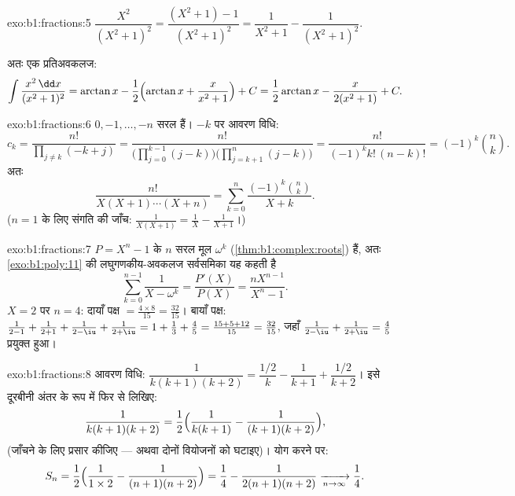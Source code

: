 \begin{solution}{exo:b1:fractions:5}
$\dfrac{X^2}{(X^2+1)^2} = \dfrac{(X^2 + 1) - 1}{(X^2+1)^2} =
\dfrac{1}{X^2+1} - \dfrac{1}{(X^2+1)^2}$.

अतः एक प्रतिअवकलज:
\[
\int \frac{x^2\,\dd x}{(x^2+1)^2}
= \arctan x - \frac12\Bigl(\arctan x + \frac{x}{x^2+1}\Bigr) + C
= \frac12\arctan x - \frac{x}{2(x^2+1)} + C .
\]
\end{solution}

\begin{solution}{exo:b1:fractions:6}
 $0, -1, \dots, -n$ सरल हैं। $-k$ पर आवरण विधि:
\[
c_k = \frac{n!}{\prod_{j \neq k} (-k + j)}
= \frac{n!}{\bigl(\prod_{j=0}^{k-1}(j - k)\bigr)
\bigl(\prod_{j=k+1}^{n}(j-k)\bigr)}
= \frac{n!}{(-1)^k k!\,(n-k)!} = (-1)^k \binom nk .
\]
अतः
\[
\frac{n!}{X(X+1)\cdots(X+n)}
= \sum_{k=0}^{n} \frac{(-1)^k \binom nk}{X + k} .
\]
($n = 1$ के लिए संगति की जाँच: $\frac{1}{X(X+1)} = \frac1X -
\frac{1}{X+1}$।)
\end{solution}

\begin{solution}{exo:b1:fractions:7}
$P = X^n - 1$ के $n$ सरल मूल $\omega^k$ (\cref{thm:b1:complex:roots}) हैं,
अतः \cref{exo:b1:poly:11} की लघुगणकीय-अवकलज सर्वसमिका यह कहती है
\[
\sum_{k=0}^{n-1} \frac{1}{X - \omega^k}
= \frac{P'(X)}{P(X)} = \frac{n X^{n-1}}{X^n - 1} .
\]
$X = 2$ पर $n = 4$: दायाँ पक्ष $= \frac{4 \times 8}{15} = \frac{32}{15}$।
बायाँ पक्ष: $\frac{1}{2-1} + \frac{1}{2+1} + \frac{1}{2 - \iu} + \frac{1}{2
+ \iu} = 1 + \frac13 + \frac{4}{5} = \frac{15 + 5 + 12}{15} =
\frac{32}{15}$, जहाँ $\frac{1}{2-\iu} + \frac{1}{2+\iu} = \frac{4}{5}$
प्रयुक्त हुआ।
\end{solution}

\begin{solution}{exo:b1:fractions:8}
आवरण विधि: $\dfrac{1}{k(k+1)(k+2)} = \dfrac{1/2}{k} - \dfrac{1}{k+1} +
\dfrac{1/2}{k+2}$। इसे दूरबीनी अंतर के रूप में फिर से लिखिए:
\[
\frac{1}{k(k+1)(k+2)}
= \frac12\Bigl(\frac{1}{k(k+1)} - \frac{1}{(k+1)(k+2)}\Bigr),
\]
(जाँचने के लिए प्रसार कीजिए --- अथवा दोनों वियोजनों को घटाइए)। योग करने पर:
\[
S_n = \frac12\Bigl(\frac{1}{1 \times 2} - \frac{1}{(n+1)(n+2)}\Bigr)
= \frac14 - \frac{1}{2(n+1)(n+2)}
\xrightarrow[n \to \infty]{} \frac14 .
\]
\end{solution}

